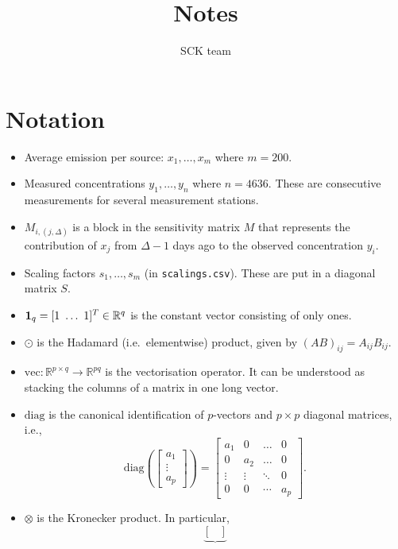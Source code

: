 \documentclass{article}
\title{Notes}
\author{SCK team}
\date{}
\begin{document}
    \maketitle

\section{Notation}
\begin{itemize}
    \item Average emission per source: $x_1,\dots,x_m$ where $m = 200$.
    \item Measured concentrations $y_1,\dots,y_n$ where $n = 4636$. These are consecutive measurements for several measurement stations. 
    \item $M_{i,(j,\Delta)}$ is a block in the sensitivity matrix $M$ that represents the contribution of $x_j$ from $\Delta - 1$ days ago to the observed concentration $y_i$.
    \item Scaling factors $s_1,\dots,s_m$ (in \texttt{scalings.csv}). These are put in a diagonal matrix $S$.
    \item $\vb{1}_q = [1\,\, \dots\,\, 1]^T \in \mathbb{R}^q$ is the constant vector consisting of only ones.
    \item $\odot$ is the Hadamard (i.e.\, elementwise) product, given by $(AB)_{ij} = A_{ij} B_{ij}$.
    \item $\mathrm{vec}: \mathbb{R}^{p \times q} \rightarrow \mathbb{R}^{pq}$ is the vectorisation operator. It can be understood as stacking the columns of a matrix in one long vector. 
    \item $\mathrm{diag}$ is the canonical identification of $p$-vectors and $p \times p$ diagonal matrices, i.e.,
    $$
    \mathrm{diag}\left(
    \begin{bmatrix}
        a_1 \\ 
        \vdots \\
        a_p
    \end{bmatrix}
    \right)
    =
    \begin{bmatrix}
        a_1 & 0 & \dots & 0 \\
        0 & a_2 & \dots & 0 \\
        \vdots & \vdots & \ddots & 0 \\
        0 & 0 & \cdots & a_p
    \end{bmatrix}
    .$$
    \item $\otimes$ is the Kronecker product. In particular,
        $$
        \underbrace{
        \begin{bmatrix}

\end{bmatrix}}$$
\end{itemize}
\end{document}
